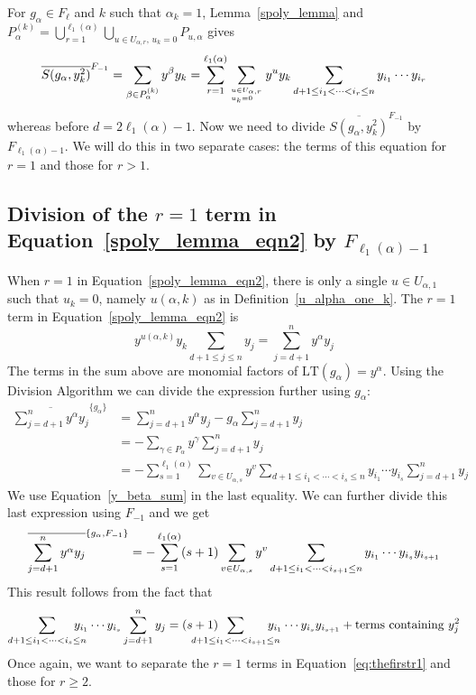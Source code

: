 \documentclass[10pt,a4paper]{article}
\begin{document}
For $g_\alpha\in F_\ell$ and $k$ such that
$\alpha_k = 1$, Lemma~\ref{spoly_lemma} and $P_\alpha^{(k)} = \bigcup_{r = 1}^{\ell_1(\alpha)} \bigcup_{u \in U_{\alpha,r},\,u_k=0 } P_{u,\alpha}$ gives
\begin{equation}
 \label{spoly_lemma_eqn2}
	\overline{S(g_\alpha, y_k^2)}^{F_{-1}} = \sum_{\beta \in P_\alpha^{(k)}} y^\beta y_k  = \sum_{r=1}^{\ell_1(\alpha)}\sum_{u \in U_{\alpha,r}\atop u_k=0 \hfill} y^{u}y_k \sum_{d+1 \leq i_1 < \cdots < i_r \leq n} y_{i_1} \cdots y_{i_{r}}  
\end{equation} 
whereas before $d=2\ell_1(\alpha)-1$. Now we need to divide $\overline{S(g_\alpha, y_k^2)}^{F_{-1}}$ by $F_{\ell_1(\alpha)-1}$. We will do this in two separate cases: the terms of this equation for $r=1$ and those for $r>1$.


\subsection{Division of the $r=1$ term in Equation~\eqref{spoly_lemma_eqn2} by $F_{\ell_1(\alpha)-1}$}  \label{beta_prime_redu} 
When $r=1$ in Equation~\eqref{spoly_lemma_eqn2}, there is only a single $u\in U_{\alpha,1}$ such that $u_k=0$, namely $u(\alpha,k)$ as in Definition~\ref{u_alpha_one_k}.
The $r=1$ term in Equation~\eqref{spoly_lemma_eqn2} is 
$$
	 y^{u(\alpha,k)}y_k \sum_{d+1 \leq j \leq n}  y_{j}  = \sum_{j=d+1}^n y^\alpha y_j 
$$
The terms in the sum above are monomial factors of $\text{LT}(g_\alpha) = y^\alpha$.  Using the Division Algorithm we can divide the expression further using $ g_\alpha$:
    \begin{align*}
    \overline{ \sum_{j=d+1}^n y^\alpha y_j }^{\{g_\alpha\}} &=  \sum_{j=d+1}^n y^\alpha y_j - g_\alpha \sum_{j=d+1}^n y_j  \\
    &=  -\sum_{\gamma \in P_\alpha}y^\gamma \sum_{j=d+1}^n y_j \\ 
    &= - \sum_{s=1}^{\ell_1(\alpha)} \sum_{v \in U_{\alpha,s}} y^v \sum_{d+1 \leq i_1 < \cdots < i_s \leq n}y_{i_1} \cdots y_{i_s} \sum_{j=d+1}^n y_j
\end{align*}
We use Equation~\eqref{y_beta_sum} in the last equality. We can further divide this last expression using $F_{-1}$ and we get
\begin{equation}\label{eq:thefirstr1}
    \overline{ \sum_{j=d+1}^n y^\alpha y_j }^{\{g_\alpha,F_{-1}\}} 
    = - \sum_{s=1}^{\ell_1(\alpha)} (s+1) \sum_{v \in U_{\alpha,s}} y^v \sum_{d+1 \leq i_1 < \cdots < i_{s+1} \leq n}y_{i_1} \cdots y_{i_s} y_{i_{s+1}} \\
\end{equation}
This result follows from the fact that 
\begin{align*}
   \sum_{d+1 \leq i_1 < \cdots < i_s \leq n} \hskip-12pt y_{i_1} \cdots y_{i_s} \sum_{j=d+1}^n y_j = (s+1)\hskip-24pt \sum_{d+1 \leq i_1 < \cdots < i_{s+1} \leq n} \hskip-12pt y_{i_1} \cdots y_{i_s} y_{i_{s+1}} + \text{terms containing $y_j^2$}
\end{align*}
Once again, we want to separate the $r=1$ terms in Equation~\eqref{eq:thefirstr1} and those for $r \geq 2$.
\end{document}
